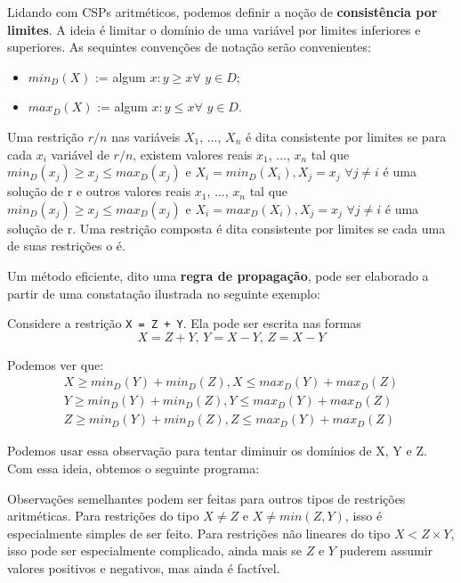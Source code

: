 \documentclass{article}
\begin{document}
Lidando com CSPs aritméticos, podemos definir a noção de \textbf{consistência por limites}. A ideia é limitar o domínio
de uma variável por limites inferiores e superiores. As sequintes convenções de notação serão convenientes:

\begin{itemize}
  \item $min_D(X)$ := algum $x: y \geq x \forall$ $y \in D$;
  \item $max_D(X)$ := algum $x: y \leq x \forall$ $y \in D$. %
\end{itemize}

\begin{definition}
  Uma restrição $r/n$ nas variáveis $X_1$, ..., $X_n$ é dita consistente por limites
  se para cada $x_i$ variável de $r/n$, existem valores reais $x_1$, ..., $x_n$ tal que $min_D(x_j) \geq x_j \leq max_D(x_j)$
  e $X_i = min_D(X_i), X_j = x_j$ $\forall j \neq i$ é uma solução de r e outros valores reais $x_1$, ..., $x_n$ tal que
  $min_D(x_j) \geq x_j \leq max_D(x_j)$  e $X_i = max_D(X_i), X_j = x_j$ $\forall j \neq i$ é uma solução de r. %
  Uma restrição composta é dita consistente por limites se cada uma de suas restrições o é.
\end{definition}

Um método eficiente, dito uma \textbf{regra de propagação}, pode ser elaborado a partir
de uma constatação ilustrada no seguinte exemplo:

Considere a restrição {\tt X = Z + Y}. Ela pode ser escrita nas formas
\[
  X = Z + Y \text{, } Y = X - Y \text{, } Z = X - Y
\]

Podemos ver que:
\begin{gather}
  X \geq min_D(Y)+min_D(Z),  X \leq max_D(Y) + max_D(Z)\\
  Y \geq min_D(Y)+min_D(Z),  Y \leq max_D(Y) + max_D(Z)\\
  Z \geq min_D(Y)+min_D(Z),  Z \leq max_D(Y) + max_D(Z)
\end{gather}

Podemos usar essa observação para tentar diminuir os domínios de X, Y e Z. Com essa ideia, obtemos o seguinte programa:

\label{lst:bounds}

Observações semelhantes podem ser feitas para outros tipos de restrições aritméticas. Para restrições do tipo $X \neq Z$ e $X  \neq min(Z, Y)$, isso é especialmente simples de ser feito. Para restrições  não lineares do tipo $X < Z\times Y$, isso pode ser
especialmente complicado, ainda mais se $Z$ e $Y$ puderem assumir valores positivos e negativos, mas ainda é factível.
\end{document}
